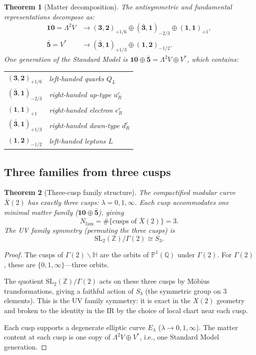 \documentclass[12pt]{article}
\theoremstyle{plain}
\newtheorem{theorem}{Theorem}[section]
\theoremstyle{definition}
\numberwithin{equation}{section}
\newcommand{\Z}{\mathbb{Z}}
\newcommand{\Q}{\mathbb{Q}}
\newcommand{\HH}{\mathbb{H}}
\begin{document}
\begin{theorem}[Matter decomposition]\label{thm:matter}
The antisymmetric and fundamental representations decompose as:
\begin{align}
\mathbf{10}=\Lambda^2 V&\to(\mathbf{3},\mathbf{2})_{+1/6}\oplus(\bar{\mathbf{3}},\mathbf{1})_{-2/3}\oplus(\mathbf{1},\mathbf{1})_{+1},\\
\bar{\mathbf{5}}=V^*&\to(\bar{\mathbf{3}},\mathbf{1})_{+1/3}\oplus(\mathbf{1},\mathbf{2})_{-1/2}.
\end{align}
One generation of the Standard Model is $\mathbf{10}\oplus\bar{\mathbf{5}}=\Lambda^2 V\oplus V^*$, which contains:
\begin{center}
\begin{tabular}{ll}
$(\mathbf{3},\mathbf{2})_{+1/6}$ & left-handed quarks $Q_L$\\
$(\bar{\mathbf{3}},\mathbf{1})_{-2/3}$ & right-handed up-type $u_R^c$\\
$(\mathbf{1},\mathbf{1})_{+1}$ & right-handed electron $e_R^c$\\
$(\bar{\mathbf{3}},\mathbf{1})_{+1/3}$ & right-handed down-type $d_R^c$\\
$(\mathbf{1},\mathbf{2})_{-1/2}$ & left-handed leptons $L$
\end{tabular}
\end{center}
\end{theorem}

\subsection{Three families from three cusps}

\begin{theorem}[Three-cusp family structure]\label{thm:threecusp}
The compactified modular curve $\bar{X}(2)$ has exactly three cusps: $\lambda=0,1,\infty$.  Each cusp accommodates one minimal matter family ($\mathbf{10}\oplus\bar{\mathbf{5}}$), giving
\begin{equation}
N_{\mathrm{fam}} = \#\{\text{cusps of }\bar{X}(2)\} = 3.
\end{equation}
The UV family symmetry (permuting the three cusps) is
\begin{equation}
\mathrm{SL}_2(\Z)/\Gamma(2) \cong S_3.
\end{equation}
\end{theorem}

\begin{proof}
The cusps of $\Gamma(2)\backslash\HH$ are the orbits of $\mathbb{P}^1(\Q)$ under $\Gamma(2)$.  For $\Gamma(2)$, these are $\{0,1,\infty\}$---three orbits.

The quotient $\mathrm{SL}_2(\Z)/\Gamma(2)$ acts on these three cusps by M\"obius transformations, giving a faithful action of $S_3$ (the symmetric group on 3 elements).  This is the UV family symmetry: it is exact in the $X(2)$ geometry and broken to the identity in the IR by the choice of local chart near each cusp.

Each cusp supports a degenerate elliptic curve $E_\lambda$ ($\lambda\to 0,1,\infty$).  The matter content at each cusp is one copy of $\Lambda^2 V\oplus V^*$, i.e., one Standard Model generation.
\end{proof}
\end{document}
